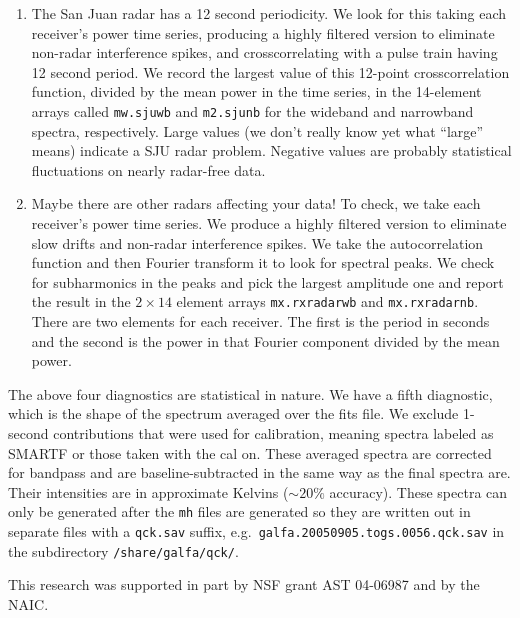 \documentclass[psfig,preprint]{aastex}
\begin{document}
\begin{enumerate}
	\item The San Juan radar has a 12 second periodicity.  We look
for this taking each receiver's power time series, producing a highly
filtered version to eliminate non-radar interference spikes, and
crosscorrelating with a pulse train having 12 second period.  We record
the largest value of this 12-point crosscorrelation function, divided by
the mean power in the time series, in the 14-element arrays called
\verb$mw.sjuwb$ and \verb$m2.sjunb$ for the wideband and narrowband
spectra, respectively.  Large values (we don't really know yet what
``large'' means) indicate a SJU radar problem.  Negative values are
probably statistical fluctuations on nearly radar-free data. 

	\item Maybe there are other radars affecting your data! To check,
we take each receiver's power time series.  We produce a highly filtered
version to eliminate slow drifts and non-radar interference spikes.  We
take the autocorrelation function and then Fourier transform it to look
for spectral peaks.  We check for subharmonics in the peaks and pick the
largest amplitude one and report the result in the $2 \times 14$ element
arrays \verb$mx.rxradarwb$ and \verb$mx.rxradarnb$.  There are two
elements for each receiver.  The first is the period in seconds and the
second is the power in that Fourier component divided by the mean power. 

\end{enumerate}

	The above four diagnostics are statistical in nature.  We have a
fifth diagnostic, which is the shape of the spectrum averaged over the
fits file.  We exclude 1-second contributions that were used for
calibration, meaning spectra labeled as SMARTF or those taken with the
cal on.  These averaged spectra are corrected for bandpass and are
baseline-subtracted in the same way as the final spectra are.  Their
intensities are in approximate Kelvins ($\sim 20\%$ accuracy).  These
spectra can only be generated after the \verb$mh$ files are generated so
they are written out in separate files with a \verb$qck.sav$ suffix,
e.g.\ \verb$galfa.20050905.togs.0056.qck.sav$ in the subdirectory
\verb$/share/galfa/qck/$. 

\acknowledgements

        This research was supported in part by NSF grant AST 04-06987    
and by the NAIC.
\end{document}
